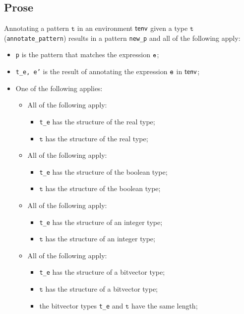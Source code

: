 \documentclass{book}
\newcommand\vt[0]{\texttt{t}}
\begin{document}
    \subsection{Prose}
      Annotating a pattern $\vt$ in an environment $\textsf{tenv}$ given a type $\vt$ (\texttt{annotate\_pattern}) results in a pattern \texttt{new\_p} and all of the following apply:
      \begin{itemize}
        \item \texttt{p} is the pattern that matches the expression $\texttt{e}$;
        \item \texttt{t\_e, e'} is the result of annotating the expression $\texttt{e}$ in $\textsf{tenv}$;
        \item One of the following applies:
          \begin{itemize}
            \item All of the following apply:
              \begin{itemize}
                \item \texttt{t\_e} has the structure of the real type;
                \item $\vt$ has the structure of the real type;
              \end{itemize}
            \item All of the following apply:
              \begin{itemize}
                \item \texttt{t\_e} has the structure of the boolean type;
                \item $\vt$ has the structure of the boolean type;
              \end{itemize}
            \item All of the following apply:
              \begin{itemize}
                \item \texttt{t\_e} has the structure of an integer type;
                \item $\vt$ has the structure of an integer type;
              \end{itemize}
            \item All of the following apply:
              \begin{itemize}
                \item \texttt{t\_e} has the structure of a bitvector type;
                \item $\vt$ has the structure of a bitvector type;
                \item the bitvector types \texttt{t\_e} and $\vt$ have the same length;

\end{itemize}
\end{itemize}
\end{itemize}
\end{document}
